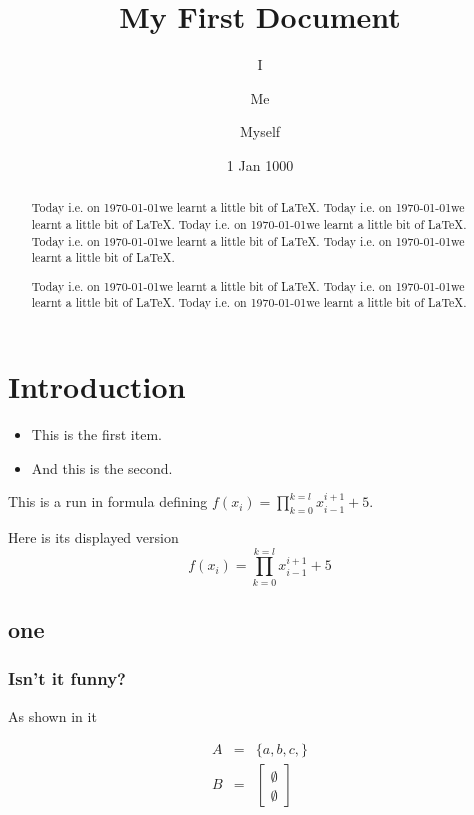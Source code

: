 \documentclass[12pt]{article}
\title{My First Document}
\author{I \and Me \and Myself}
\date{1 Jan 1000}
\begin{document}
\maketitle

\begin{abstract}
\footnotesize
\sffamily

Today i.e. on \today   we learnt a little bit of \LaTeX.
Today i.e. on \today   we learnt a little bit of \LaTeX.
Today i.e. on \today   we learnt a little bit of \LaTeX.
Today i.e. on \today   we learnt a little bit of \LaTeX.
Today i.e. on \today   we learnt a little bit of \LaTeX.

\normalsize
Today i.e. on \today   we learnt a little bit of \LaTeX.
Today i.e. on \today   we learnt a little bit of \LaTeX.
Today i.e. on \today   we learnt a little bit of \LaTeX.
\end{abstract}

\section{Introduction}

\begin{itemize}
\item This is the first item.
\item And this is the second.
\end{itemize}

This is a run in formula defining $f(x_i) = \prod_{k=0}^{k=l} x^{i+1}_{i-1} +
5$.

Here is its displayed version
\[f(x_i) = \prod_{k=0}^{k=l} x^{i+1}_{i-1} + 5\]

\subsection{one} 

\subsubsection{Isn't it funny?}

As shown in \cite{Nie83indiaH} it
\nocite{MyNi83icalp}


\begin{eqnarray}
A & = & \{ a, b, c, \} \label{eq:1} \\ \nonumber
B & = & \left[ \begin{array}{c}\emptyset \\ \emptyset \end{array}\right]
\end{eqnarray}
\end{document}
